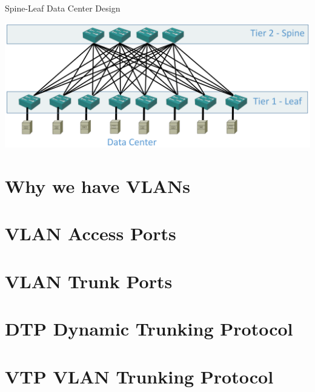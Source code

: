\documentclass[pdflatex,compress,mathserif]{beamer}
\begin{document}
\begin{frame}{Spine-Leaf Data Center Design}
	\begin{center}
		\includegraphics[width=\linewidth]{img/img08}
	\end{center}
\end{frame}

\section{Why we have VLANs}

\section{VLAN Access Ports}

\section{VLAN Trunk Ports}

\section{DTP Dynamic Trunking Protocol}

\section{VTP VLAN Trunking Protocol}
\end{document}
